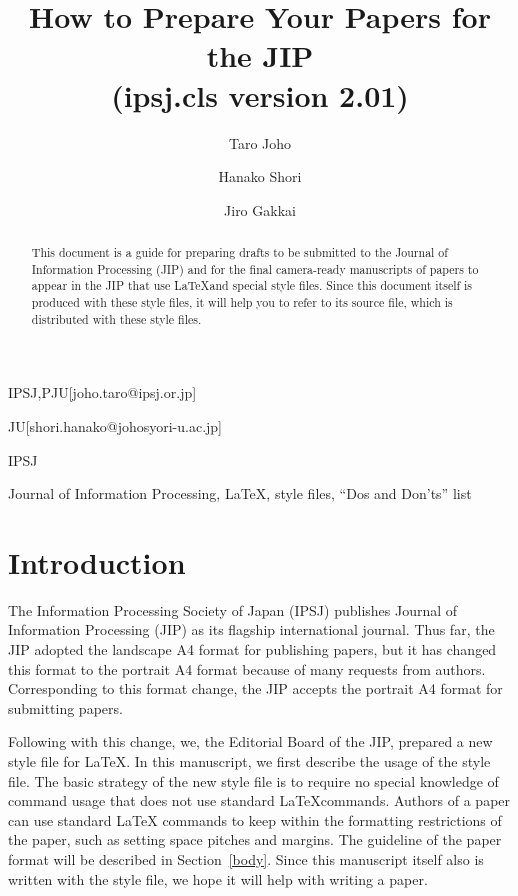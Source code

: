 \documentclass[english,preprint,JIP]{ipsj}
\begin{document}
\title{How to Prepare Your Papers for the JIP\\
(ipsj.cls version 2.01)}


\author{Taro Joho}{IPSJ,PJU}[joho.taro@ipsj.or.jp]
\author{Hanako Shori}{JU}[shori.hanako@johosyori-u.ac.jp]
\author{Jiro Gakkai}{IPSJ}


\begin{abstract}
This document is a guide for preparing drafts to be submitted to the
Journal of Information Processing (JIP) and for the final camera-ready
manuscripts of papers to appear in the JIP that use \LaTeX and special
style files.  Since this document itself is produced with these style
files, it will help you to refer to its source file, which is
distributed with these style files.
\end{abstract}

\begin{keyword}
Journal of Information Processing, \LaTeX, style files, ``Dos and
 Don'ts'' list
\end{keyword}

\maketitle

\section{Introduction}

The Information Processing Society of Japan (IPSJ) publishes Journal of
Information Processing (JIP) as its flagship international journal.
Thus far, the JIP adopted the landscape A4 format for publishing papers,
but it has changed this format to the portrait A4 format because of many
requests from authors.  Corresponding to this format change, the JIP
accepts the portrait A4 format for submitting papers.

Following with this change, we, the Editorial Board of the JIP, prepared
a new style file for \LaTeX\@.  In this manuscript, we first describe
the usage of the style file.  The basic strategy of the new style file
is to require no special knowledge of command usage that does not use
standard \LaTeX commands.  Authors of a paper can use standard \LaTeX
commands to keep within the formatting restrictions of the paper, such
as setting space pitches and margins.  The guideline of the paper format
will be described in Section~\ref{body}.  Since this manuscript itself
also is written with the style file, we hope it will help with writing a
paper.
\end{document}
